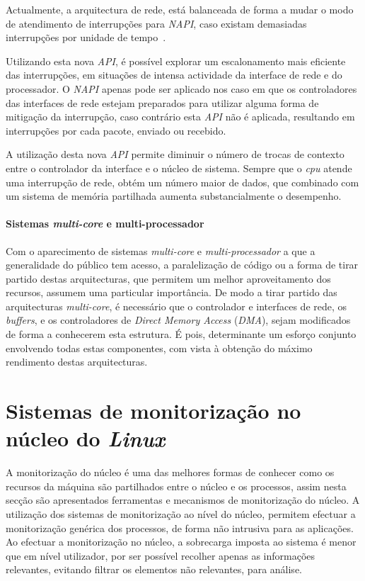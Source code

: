 Actualmente, a arquitectura de rede, está balanceada de forma a mudar o modo de atendimento de interrupções para \textit{NAPI}, caso existam demasiadas interrupções por unidade de tempo~\cite{administrator:napi}.

Utilizando esta nova \textit{API}, é possível explorar um escalonamento mais eficiente das interrupções, em situações de intensa actividade da interface de rede e do processador.
O \textit{NAPI} apenas pode ser aplicado nos caso em que os controladores das interfaces de rede estejam preparados para utilizar alguma forma de mitigação da interrupção, caso contrário esta \textit{API} não é aplicada, resultando em interrupções por cada pacote, enviado ou recebido.

A utilização desta nova \textit{API} permite diminuir o número de trocas de contexto entre o controlador da interface e o núcleo de sistema.
Sempre que o \textit{cpu} atende uma interrupção de rede, obtém um número maior de dados, que combinado com um sistema de memória partilhada aumenta substancialmente o desempenho.

\paragraph*{Sistemas \textit{multi-core} e multi-processador}

Com o aparecimento de sistemas \textit{multi-core} e \textit{multi-processador} a que a generalidade do público tem acesso, a paralelização de código ou a forma de tirar partido destas arquitecturas, que permitem um melhor aproveitamento dos recursos, assumem uma particular importância.
De modo a tirar partido das arquitecturas \textit{multi-core}, é necessário que o controlador e interfaces de rede, os \textit{buffers}, e os controladores de \textit{Direct Memory Access} (\textit{DMA}), sejam modificados de forma a conhecerem esta estrutura.
É pois, determinante um esforço conjunto envolvendo todas estas componentes, com vista à obtenção do máximo rendimento destas arquitecturas\cite{Deri:2010}.



\section{Sistemas de monitorização no núcleo do \textit{Linux}}\label{sect:instrumentacao_casos_linux}

A monitorização do núcleo é uma das melhores formas de conhecer como os recursos da máquina são partilhados entre o núcleo e os processos, assim nesta secção são apresentados ferramentas e mecanismos de monitorização do núcleo.
A utilização dos sistemas de monitorização ao nível do núcleo, permitem efectuar a monitorização genérica dos processos, de forma não intrusiva para as aplicações.
Ao efectuar a monitorização no núcleo, a sobrecarga imposta ao sistema é menor que em nível utilizador, por ser possível recolher apenas as informações relevantes, evitando filtrar os elementos não relevantes, para análise.

